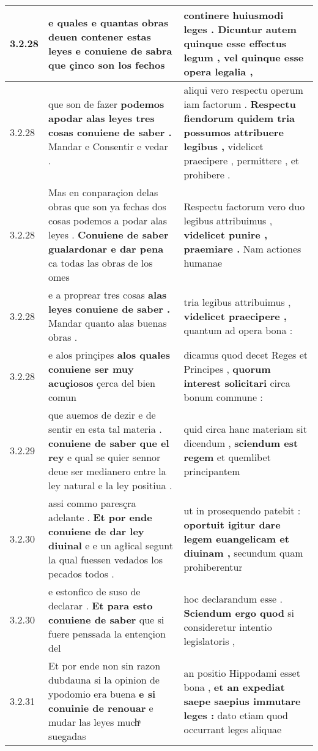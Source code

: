 \begin{tabular}{|p{1cm}|p{6.5cm}|p{6.5cm}|}
3.2.28 & e quales e quantas obras deuen contener estas leyes \textbf{ e conuiene de sabra } que çinco son los fechos & continere huiusmodi leges . \textbf{ Dicuntur autem quinque esse effectus legum , } vel quinque esse opera legalia , \\\hline
3.2.28 & que son de fazer \textbf{ podemos apodar alas leyes tres cosas conuiene de saber . } Mandar e Consentir e vedar . & aliqui vero respectu operum iam factorum . \textbf{ Respectu fiendorum quidem tria possumos attribuere legibus , } videlicet praecipere , permittere , et prohibere . \\\hline
3.2.28 & Mas en conparaçion delas obras que son ya fechas dos cosas podemos a podar alas leyes . \textbf{ Conuiene de saber gualardonar e dar pena } ca todas las obras de los omes & Respectu factorum vero duo legibus attribuimus , \textbf{ videlicet punire , praemiare . } Nam actiones humanae \\\hline
3.2.28 & e a proprear tres cosas \textbf{ alas leyes conuiene de saber . } Mandar quanto alas buenas obras . & tria legibus attribuimus , \textbf{ videlicet praecipere , } quantum ad opera bona : \\\hline
3.2.28 & e alos prinçipes \textbf{ alos quales conuiene ser muy acuçiosos } çerca del bien comun & dicamus quod decet Reges et Principes , \textbf{ quorum interest solicitari } circa bonum commune : \\\hline
3.2.29 & que auemos de dezir e de sentir en esta tal materia . \textbf{ conuiene de saber que el rey } e qual se quier sennor deue ser medianero entre la ley natural e la ley positiua . & quid circa hanc materiam sit dicendum , \textbf{ sciendum est regem } et quemlibet principantem \\\hline
3.2.30 & assi commo paresçra adelante . \textbf{ Et por ende conuiene de dar ley diuinal } e e un agłical segunt la qual fuessen vedados los pecados todos . & ut in prosequendo patebit : \textbf{ oportuit igitur dare legem euangelicam et diuinam , } secundum quam prohiberentur \\\hline
3.2.30 & e estonfico de suso de declarar . \textbf{ Et para esto conuiene de saber } que si fuere penssada la entençion del & hoc declarandum esse . \textbf{ Sciendum ergo quod } si consideretur intentio legislatoris , \\\hline
3.2.31 & Et por ende non sin razon dubdauna si la opinion de ypodomio era buena \textbf{ e si conuinie de renouar } e mudar las leyes muchͣ suegadas & an positio Hippodami esset bona , \textbf{ et an expediat saepe saepius immutare leges : } dato etiam quod occurrant leges aliquae \\\hline

\end{tabular}
